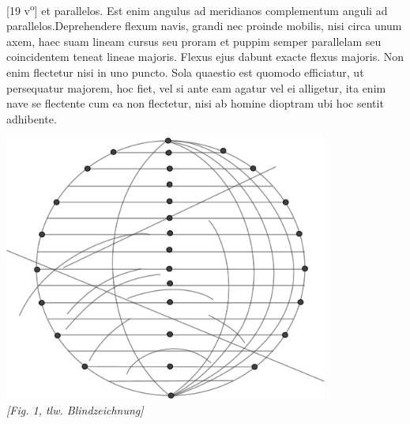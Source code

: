 [19 v\textsuperscript{o}] et parallelos\protect{}. Est enim angulus ad meridianos\protect{} complementum anguli ad parallelos\protect{}.\pend \pstart Deprehendere flexum navis\protect{},  grandi  nec proinde mobilis, nisi circa unum axem, haec suam lineam cursus seu proram et puppim semper parallelam seu coincidentem teneat lineae majoris. Flexus ejus dabunt exacte flexus majoris. Non enim flectetur nisi in uno puncto. Sola quaestio est quomodo efficiatur, ut persequatur majorem, hoc fiet, vel si ante eam agatur vel ei alligetur, ita enim nave\protect{} se flectente cum ea non flectetur, nisi ab homine dioptram ubi hoc sentit adhibente.\pend
   \vspace{5mm}
   \begin{center}
   \includegraphics[width=0.8\textwidth]{images/38_19v}\\
   \textit{[Fig. 1, tlw. Blindzeichnung]}\\
   \end{center}